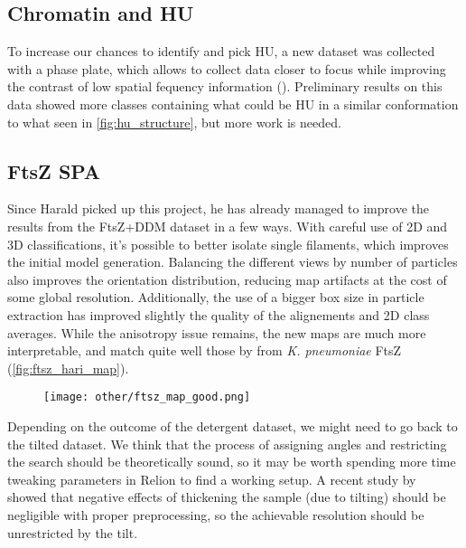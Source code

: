 \subsection{Chromatin and HU}

To increase our chances to identify and pick HU, a new dataset was collected with a phase plate, which allows to collect data closer to focus while improving the contrast of low spatial fequency information ().
Preliminary results on this data showed more classes containing what could be HU in a similar conformation to what seen in \autoref{fig:hu_structure}, but more work is needed.


\subsection{FtsZ SPA}

Since Harald picked up this project, he has already managed to improve the results from the FtsZ+DDM dataset in a few ways.
With careful use of 2D and 3D classifications, it's possible to better isolate single filaments, which improves the initial model generation.
Balancing the different views by number of particles also improves the orientation distribution, reducing map artifacts at the cost of some global resolution.
Additionally, the use of a bigger box size in particle extraction has improved slightly the quality of the alignements and 2D class averages.
While the anisotropy issue remains, the new maps are much more interpretable, and match quite well those by \citet{fujitaStructuresFtsZSingle2023} from \textit{K. pneumoniae} FtsZ (\autoref{fig:ftsz_hari_map}).

\begin{figure}[ht]
    \centering
    \texttt{[image: other/ftsz\_map\_good.png]}
    \label{fig:ftsz_hari_map}
\end{figure}

Depending on the outcome of the detergent dataset, we might need to go back to the tilted dataset.
We think that the process of assigning angles and restricting the search should be theoretically sound, so it may be worth spending more time tweaking parameters in Relion to find a working setup.
A recent study by ~\citet{aiyerOvercomingResolutionAttenuation2024} showed that negative effects of thickening the sample (due to tilting) should be negligible with proper preprocessing, so the achievable resolution should be unrestricted by the tilt.

